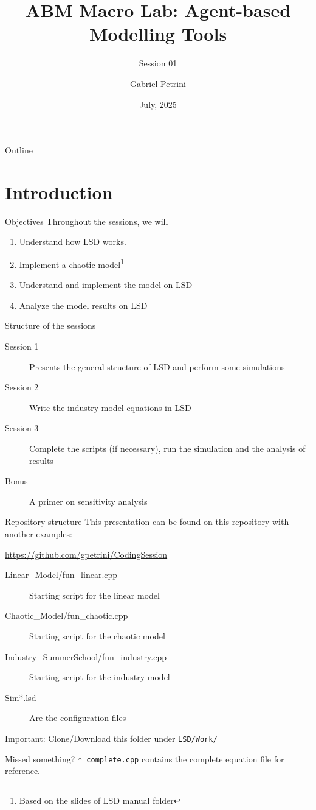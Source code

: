 \documentclass[bigger,aspectratio=169]{beamer}
\author{Gabriel Petrini}
\date{July, 2025}
\title{ABM Macro Lab: Agent-based Modelling Tools}
\subtitle{Session 01}
\begin{document}
\maketitle
\begin{frame}{Outline}
\tableofcontents
\end{frame}

\section{Introduction}
\label{sec:orge87a8d0}

\begin{frame}[label={sec:org7a7cc8f}]{Objectives}
Throughout the sessions, we will

\begin{enumerate}
\item Understand how LSD works.
\item Implement a chaotic model\footnote{Based on the slides of LSD manual folder}
\item Understand and implement the \textcite{dosi_2017_footprint} model on LSD
\item Analyze the model results on LSD
\end{enumerate}
\end{frame}
\begin{frame}[label={sec:org0deb3c8}]{Structure of the sessions}
\begin{description}
\item[{Session 1}] Presents the general structure of LSD and perform some simulations
\item[{Session 2}] Write the industry model equations in LSD
\item[{Session 3}] Complete the scripts (if necessary), run the simulation and the analysis of results
\item[{Bonus}] A primer on sensitivity analysis
\end{description}
\end{frame}
\begin{frame}[label={sec:orgd90a266},fragile]{Repository structure}
 This presentation can be found on this \href{https://github.com/gpetrini/CodingSession}{repository} with another examples:

\url{https://github.com/gpetrini/CodingSession}

\begin{description}
\item[{Linear\_Model/fun\_linear.cpp}] Starting script for the linear model
\item[{Chaotic\_Model/fun\_chaotic.cpp}] Starting script for the chaotic model
\item[{Industry\_SummerSchool/fun\_industry.cpp}] Starting script for the industry model
\item[{Sim*.lsd}] Are the configuration files
\end{description}

\alert{Important:} Clone/Download this folder under \texttt{LSD/Work/}
\begin{block}{Missed something?}
\texttt{*\_complete.cpp} contains the complete equation file for reference.
\end{block}
\end{frame}
\end{document}
